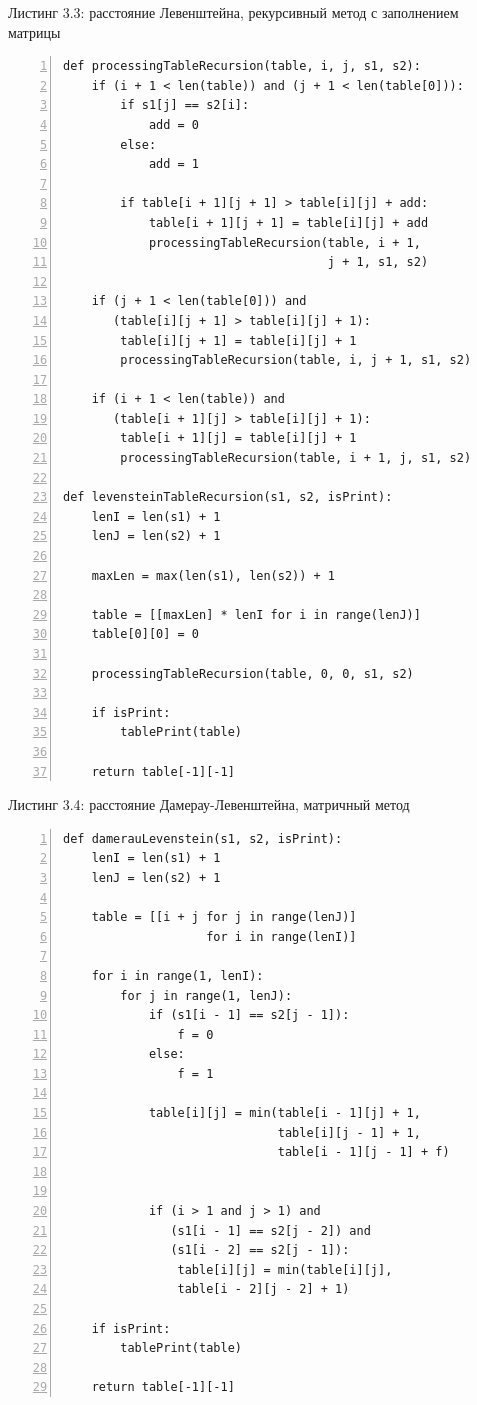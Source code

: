 \documentclass[12pt,a4paper]{report}
\begin{document}
\textrm{Листинг 3.3: расстояние Левенштейна, рекурсивный метод с заполнением матрицы}
\begin{lstlisting}[frame=single, numbers=left]
def processingTableRecursion(table, i, j, s1, s2):
    if (i + 1 < len(table)) and (j + 1 < len(table[0])):
        if s1[j] == s2[i]:
            add = 0
        else:
            add = 1 
        
        if table[i + 1][j + 1] > table[i][j] + add:
            table[i + 1][j + 1] = table[i][j] + add
            processingTableRecursion(table, i + 1, 
                                     j + 1, s1, s2)
    
    if (j + 1 < len(table[0])) and 
       (table[i][j + 1] > table[i][j] + 1):
        table[i][j + 1] = table[i][j] + 1
        processingTableRecursion(table, i, j + 1, s1, s2)

    if (i + 1 < len(table)) and 
       (table[i + 1][j] > table[i][j] + 1):
        table[i + 1][j] = table[i][j] + 1
        processingTableRecursion(table, i + 1, j, s1, s2)
    
def levensteinTableRecursion(s1, s2, isPrint):
    lenI = len(s1) + 1
    lenJ = len(s2) + 1

    maxLen = max(len(s1), len(s2)) + 1

    table = [[maxLen] * lenI for i in range(lenJ)]
    table[0][0] = 0

    processingTableRecursion(table, 0, 0, s1, s2)

    if isPrint:
        tablePrint(table)
    
    return table[-1][-1]
\end{lstlisting}

\textrm{Листинг 3.4: расстояние Дамерау-Левенштейна, матричный метод}
\begin{lstlisting}[frame=single, numbers=left]
def damerauLevenstein(s1, s2, isPrint):
    lenI = len(s1) + 1
    lenJ = len(s2) + 1
    
    table = [[i + j for j in range(lenJ)] 
                    for i in range(lenI)]

    for i in range(1, lenI):
        for j in range(1, lenJ):
            if (s1[i - 1] == s2[j - 1]):
                f = 0
            else:
                f = 1
            
            table[i][j] = min(table[i - 1][j] + 1,
                              table[i][j - 1] + 1,
                              table[i - 1][j - 1] + f)
            

            if (i > 1 and j > 1) and 
               (s1[i - 1] == s2[j - 2]) and 
               (s1[i - 2] == s2[j - 1]):
                table[i][j] = min(table[i][j], 
                table[i - 2][j - 2] + 1)
        
    if isPrint:
        tablePrint(table)
    
    return table[-1][-1]
\end{lstlisting}
\end{document}
